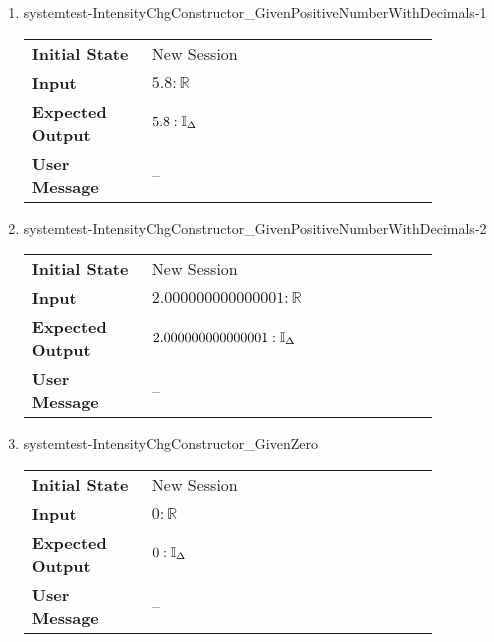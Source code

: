 \begin{enumerate}
    \item{systemtest-IntensityChgConstructor\_GivenPositiveNumberWithDecimals-1}
    \begin{table}[H]
        \centering
        \begin{tabular}{P{0.25\linewidth}P{0.6\linewidth}}
            \toprule
            \textbf{Initial State} & New Session \\
            \textbf{Input} & $5.8 : \mathbb{R}$ \\ \midrule
            \textbf{Expected Output} & $5.8 : \mathbb{I}_{\Delta}$ \\
            \textbf{User Message} & -- \\ \bottomrule
        \end{tabular}
    \end{table}

    \clearpage

    \item{systemtest-IntensityChgConstructor\_GivenPositiveNumberWithDecimals-2}
    \begin{table}[H]
        \centering
        \begin{tabular}{P{0.25\linewidth}P{0.6\linewidth}}
            \toprule
            \textbf{Initial State} & New Session \\
            \textbf{Input} & $2.000000000000001 : \mathbb{R}$ \\ \midrule
            \textbf{Expected Output} & $2.000000000000001 : \mathbb{I}_{\Delta}$
            \\
            \textbf{User Message} & -- \\ \bottomrule
        \end{tabular}
    \end{table}

    \item{systemtest-IntensityChgConstructor\_GivenZero}
    \begin{table}[H]
        \centering
        \begin{tabular}{P{0.25\linewidth}P{0.6\linewidth}}
            \toprule
            \textbf{Initial State} & New Session \\
            \textbf{Input} & $0 : \mathbb{R}$ \\ \midrule
            \textbf{Expected Output} & $0 : \mathbb{I}_{\Delta}$ \\
            \textbf{User Message} & -- \\ \bottomrule
        \end{tabular}
    \end{table}


\end{enumerate}
